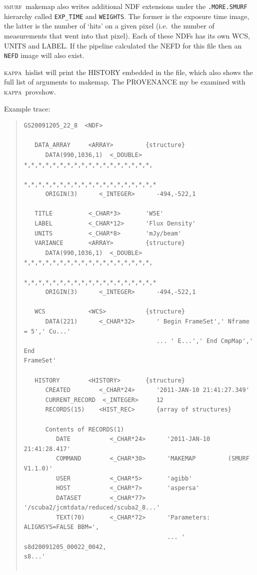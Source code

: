 \documentclass[twoside,11pt]{article}
\renewcommand{\_}{\texttt{\symbol{95}}}
\newenvironment{myquote}{\begin{quote}\begin{small}}{\end{small}\end{quote}}
\newcommand{\KAPPA}{\textsc{kappa}}
\newcommand{\SMURF}{\textsc{smurf}}
\newcommand{\task}[1]{\textsf{#1}}
\begin{document}
\SMURF\ \task{makemap} also writes additional NDF extensions under the
\verb+.MORE.SMURF+ hierarchy called \verb+EXP_TIME+ and
\verb+WEIGHTS+. The former is the exposure time image, the latter is
the number of `hits' on a given pixel (i.e.\ the number of
measurements that went into that pixel). Each of these NDFs has its
own WCS, UNITS and LABEL. If the pipeline calculated the NEFD for this
file then an \verb+NEFD+ image will also exist.

\KAPPA\ \task{hislist} will print the HISTORY embedded in the file,
which also shows the full list of arguments to \task{makemap}. The
PROVENANCE my be examined with \KAPPA\ \task{provshow}.

Example trace:
\begin{myquote}
\begin{verbatim}
GS20091205_22_8  <NDF>

   DATA_ARRAY     <ARRAY>         {structure}
      DATA(990,1036,1)  <_DOUBLE>    *,*,*,*,*,*,*,*,*,*,*,*,*,*,*,*,*,*,
                                     *,*,*,*,*,*,*,*,*,*,*,*,*,*,*,*,*,*,*
      ORIGIN(3)      <_INTEGER>      -494,-522,1

   TITLE          <_CHAR*3>       'W5E'
   LABEL          <_CHAR*12>      'Flux Density'
   UNITS          <_CHAR*8>       'mJy/beam'
   VARIANCE       <ARRAY>         {structure}
      DATA(990,1036,1)  <_DOUBLE>    *,*,*,*,*,*,*,*,*,*,*,*,*,*,*,*,*,*,
                                     *,*,*,*,*,*,*,*,*,*,*,*,*,*,*,*,*,*,*
      ORIGIN(3)      <_INTEGER>      -494,-522,1

   WCS            <WCS>           {structure}
      DATA(221)      <_CHAR*32>      ' Begin FrameSet',' Nframe = 5',' Cu...'
                                     ... ' E...',' End CmpMap',' End
FrameSet'

   HISTORY        <HISTORY>       {structure}
      CREATED        <_CHAR*24>      '2011-JAN-10 21:41:27.349'
      CURRENT_RECORD  <_INTEGER>     12
      RECORDS(15)    <HIST_REC>      {array of structures}

      Contents of RECORDS(1)
         DATE           <_CHAR*24>      '2011-JAN-10 21:41:28.417'
         COMMAND        <_CHAR*30>      'MAKEMAP         (SMURF V1.1.0)'
         USER           <_CHAR*5>       'agibb'
         HOST           <_CHAR*7>       'aspersa'
         DATASET        <_CHAR*77>
'/scuba2/jcmtdata/reduced/scuba2_8...'
         TEXT(70)       <_CHAR*72>      'Parameters: ALIGNSYS=FALSE BBM=',
                                        ... '   s8d20091205_00022_0042,
s8...'


\end{verbatim}
\end{myquote}
\end{document}
